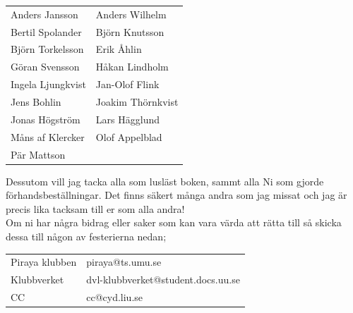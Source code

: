 \documentclass[a6paper,fontsize=10pt,twoside,openright]{scrbook}
\begin{document}
\noindent
\begin{tabular}{@{}p{}p{}@{}}
  Anders Jansson & Anders Wilhelm\\
  Bertil Spolander & Björn Knutsson\\
  Björn Torkelsson & Erik Åhlin\\
  Göran Svensson & Håkan Lindholm\\
  Ingela Ljungkvist & Jan-Olof Flink\\
  Jens Bohlin & Joakim Thörnkvist\\
  Jonas Högström & Lars Hägglund\\
  Måns af Klercker & Olof Appelblad\\
  Pär Mattson
\end{tabular}
\newpage
\indent Dessutom vill jag tacka alla som lusläst boken, sammt alla Ni
som gjorde förhandsbeställningar. Det finns säkert många andra som jag
missat och jag är precis lika tacksam till er som alla
andra!\\ \indent Om ni har några bidrag eller saker som kan vara värda
att rätta till så skicka dessa till någon av festerierna nedan;\\

\noindent
\begin{tabular}{@{}p{}p{}@{}}
  Piraya klubben & piraya@ts.umu.se\\
  Klubbverket & dvl-klubbverket@student.docs.uu.se\\
  CC & cc@cyd.liu.se
\end{tabular}\\
\end{document}
